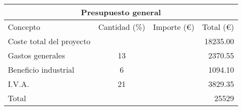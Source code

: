 \begin{table}[!htb]
\centering
\begin{tabular}{lcrr}
\toprule
\multicolumn{4}{c}{Presupuesto general}\\
\midrule
Concepto & Cantidad (\%) & Importe (\euro) & Total (\euro)\\
\midrule
Coste total del proyecto & & & 18235.00\\
Gastos generales & 13 & & 2370.55\\
Beneficio industrial & 6 & & 1094.10\\
I.V.A. & 21 & & 3829.35\\
\bottomrule
Total & & & 25529\\
\bottomrule
\end{tabular}
\label{presupuestogeneral}
\end{table}
